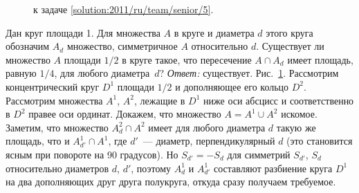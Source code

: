 \ifsolution
\begin{figure}\centering
    \caption{к задаче \ref{solution:2011/ru/team/senior/5}.}
    \label{fig:solution:2011/ru/team/senior/5}
\end{figure}
\fi %

\problem{}
Дан круг площади 1.
Для множества $A$ в круге и диаметра $d$ этого круга обозначим $A_d$ множество,
симметричное $A$ относительно $d$.
Существует ли множество $A$ площади $1 / 2$ в круге такое, что пересечение
$A \cap A_d$ имеет площадь, равную $1/4$, для любого диаметра~$d$?
\solution
\label{solution:2011/ru/team/senior/5}%
\emph{Ответ:} существует.
Рис.~\ref{fig:solution:2011/ru/team/senior/5}.
Рассмотрим концентрический круг $D^1$ площади $1 / 2$ и дополняющее его кольцо
$D^2$.
Рассмотрим множества $A^1$, $A^2$, лежащие в $D^1$ ниже оси абсцисс и
соответственно в $D^2$ правее оси ординат.
Докажем, что множество $A = A^1 \cup A^2$ искомое.
Заметим, что множество $A^2_d \cap A^2$ имеет для любого диаметра $d$ такую же
площадь, что и $A^1_{d'} \cap A^1$, где $d'$~--- диаметр, перпендикулярный $d$
(это становится ясным при повороте на 90 градусов).
Но $S_{d'} = -S_d$ для симметрий $S_{d'}$, $S_d$ относительно диаметров $d$,
$d'$, поэтому $A^1_d$ и $A^1_{d'}$ составляют разбиение круга $D^1$ на два
дополняющих друг друга полукруга, откуда сразу получаем требуемое.
\endproblem
